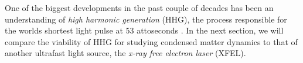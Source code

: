 One of the biggest developments in the past couple of decades has been an understanding of \textit{high harmonic generation} (HHG), the process responsible for the worlds shortest light pulse at 53 attoseconds \cite{li53attosecondXrayPulses2017}. In the next section, we will compare the viability of HHG for studying condensed matter dynamics to that of another ultrafast light source, the \textit{x-ray free electron laser} (XFEL).

%
%
%
%
%
%
%
%
%
%
%
%
%
%

